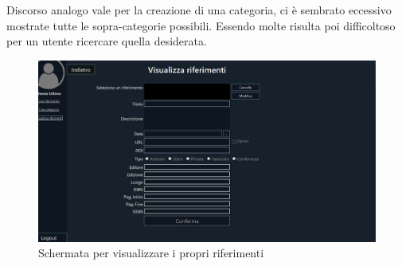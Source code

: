 Discorso analogo vale per la creazione di una categoria, ci è sembrato eccessivo mostrate tutte le sopra-categorie possibili. Essendo molte risulta poi difficoltoso per un utente ricercare quella desiderata.
\begin{figure}[H]
    \centering
            \includegraphics[width=.80\textwidth]{Immagini/VecchioProgetto/visualizza riferimenti.jpg} 

    \caption{Schermata per visualizzare i propri riferimenti}
\end{figure}

